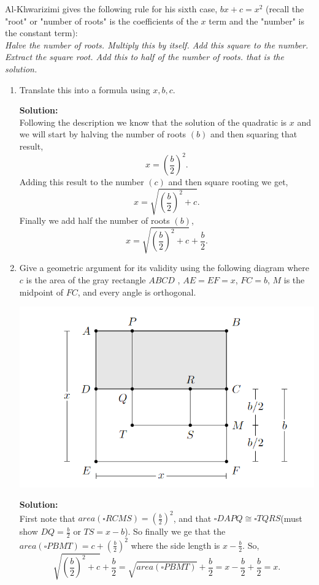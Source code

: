 \documentclass[12pt]{article}
\makeatletter
\theoremstyle{homework}
\newenvironment{exercise}[1]
{\def\@currentlabel{#1}\exercisecore}
{\endexercisecore}
\newcommand{\localhead}[1]{\par\smallskip\noindent\textbf{#1}\nobreak\\}%
\newcommand\solution{\localhead{Solution:}}
\makeatother
\begin{document}
\begin{exercise}{2}Al-Khwarizimi gives the following rule for his sixth case, $bx + c = x^2$ (recall the "root"
  or "number of roots" is the coefficients of the $x$ term and the "number" is the constant term):\\

  \indent \textit{Halve the number of roots. Multiply this by itself. Add this square to the number. Extract the square root. Add this to half of the 
  number of roots. that is the solution.}\\

  \begin{enumerate}
    \item Translate this into a formula using $x, b, c$.\\
    \solution Following the description we know that the solution of the quadratic is $x$ and we will start by halving the number
    of roots $(b)$ and then squaring that result,
    \begin{equation*}
      x = (\frac{b}{2})^2.
    \end{equation*}
    Adding this result to the number $(c)$ and then square rooting we get,
    \begin{equation*}
      x = \sqrt{(\frac{b}{2})^2 + c}.
    \end{equation*}
    Finally we add half the number of roots $(b)$,
    \begin{equation*}
      x = \sqrt{(\frac{b}{2})^2 + c} + \frac{b}{2}.
    \end{equation*}  
    \vspace{.25in}

    \item Give a geometric argument for its validity using the following diagram where $c$ is the area of the gray rectangle
    $ABCD$ , $AE = EF = x$, $FC = b$, $M$ is the midpoint of $FC$, and every angle is orthogonal.\\
    \begin{center}
      \includegraphics[width = .75\textwidth]{quadratic.png}
    \end{center}  
    \solution First note that $area(\square RCMS) = (\frac{b}{2})^2$, and that $\square DAPQ \cong \square TQRS$(must show $DQ = \frac{b}{2}$ or $TS = x - b$).
    So finally we ge that the $area(\square PBMT) = c + (\frac{b}{2})^2$ where the side length is $x - \frac{b}{2}$. So,
    \begin{equation*}
      \sqrt{(\frac{b}{2})^2 + c} + \frac{b}{2} = \sqrt{area(\square PBMT)} + \frac{b}{2} = x - \frac{b}{2} + \frac{b}{2} = x.
    \end{equation*}  



\end{enumerate}
\end{exercise}
\end{document}
